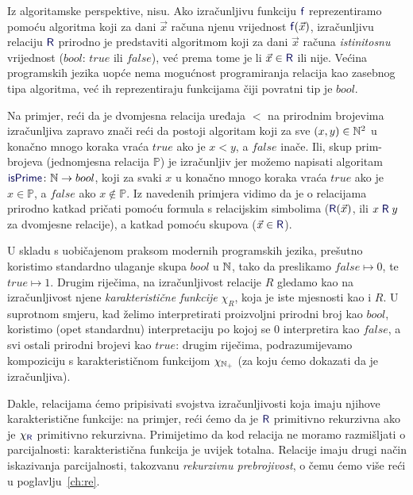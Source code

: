 Iz algoritamske perspektive, nisu. Ako izračunljivu funkciju $\f{f}$ reprezentiramo po\-mo\-ću algoritma koji za dani $\vec x$ računa njenu vrijednost $\f{f}(\vec x)$, izračunljivu relaciju $\f{R}$ prirodno je predstaviti algoritmom koji za dani $\vec x$ računa \emph{istinitosnu} vrijednost ($bool$: $\mathit{true}$ ili $\mathit{false}$), već prema tome je li $\vec x\in\f{R}$ ili nije. Većina programskih jezika uopće nema mogućnost programiranja relacija kao zasebnog tipa algoritma, već ih reprezentiraju funkcijama čiji povratni tip je $bool$.

Na primjer, reći da je dvomjesna relacija uređaja $<$ na prirodnim brojevima iz\-ra\-čun\-lji\-va zapravo znači reći da postoji algoritam koji za sve $(x,y)\in{\mathbb N}^2$ u konačno mnogo koraka vraća $\mathit{true}$ ako je $x<y$, a $\mathit{false}$ inače. Ili, skup prim-brojeva (jednomjesna relacija $\mathbb P$) je izračunljiv jer možemo napisati algoritam $\f{isPrime}\colon\N\to bool$, koji za svaki $x$ u konačno mnogo koraka vraća $\mathit{true}$ ako je $x\in\mathbb P$, a $\mathit{false}$ ako $x\not\in\mathbb P$. Iz navedenih primjera vidimo da je o relacijama prirodno katkad pričati pomoću formula s relacijskim simbolima ($\f{R}(\vec x)$, ili $x\mathrel{\f R}y$ za dvomjesne relacije), a katkad pomoću skupova ($\vec x\in\f{R}$).

U skladu s uobičajenom praksom modernih programskih jezika, prešutno koristimo standardno ulaganje skupa $bool$ u ${\mathbb N}$, tako da preslikamo $\mathit{false}\mapsto 0$, te $\mathit{true}\mapsto 1$. Drugim riječima, na izračunljivost relacije $R$ gledamo kao na izračunljivost njene \emph{karakteristične funkcije} $\chi_R$, koja je iste mjesnosti kao i $R$. U suprotnom smjeru, kad želimo interpretirati proizvoljni prirodni broj kao $bool$, koristimo (opet standardnu) interpretaciju po kojoj se $0$ interpretira kao $\mathit{false}$, a svi ostali prirodni brojevi kao $\mathit{true}$: drugim riječima, podrazumijevamo kompoziciju s karakterističnom funkcijom $\chi_{{\mathbb N}_+}$ (za koju ćemo dokazati da je izračunljiva).

Dakle, relacijama ćemo pripisivati svojstva izračunljivosti koja imaju njihove karakteristične funkcije: na primjer, reći ćemo da je $\f{R}$ primitivno rekurzivna ako je $\chi_{\f{R}}$ primitivno rekurzivna. Primijetimo da kod relacija ne moramo razmišljati o parcijalnosti: karakteristična funkcija je uvijek totalna. Relacije imaju drugi način iskazivanja parcijalnosti, takozvanu \emph{rekurzivnu prebrojivost}, o čemu ćemo više reći u poglavlju~\ref{ch:re}.

